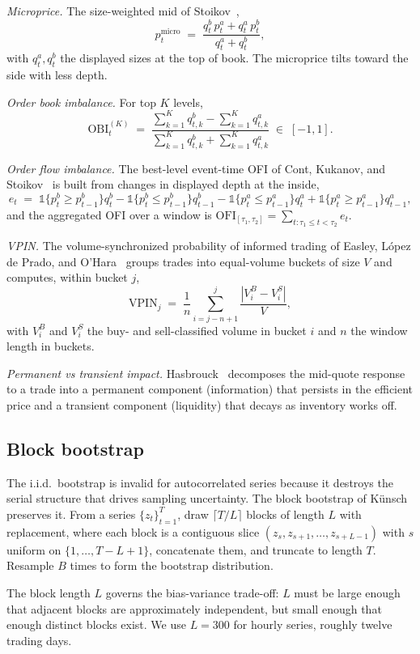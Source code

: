 \documentclass[11pt]{article}
\begin{document}
\emph{Microprice.} The size-weighted mid of Stoikov~\cite{stoikov2018microprice},
\[
p^{\mathrm{micro}}_t \;=\; \frac{q^b_t \, p^a_t + q^a_t \, p^b_t}{q^a_t + q^b_t},
\]
with $q^a_t, q^b_t$ the displayed sizes at the top of book. The microprice tilts toward the
side with less depth.

\emph{Order book imbalance.} For top $K$ levels,
\[
\mathrm{OBI}_t^{(K)} \;=\; \frac{\sum_{k=1}^{K} q^b_{t,k} - \sum_{k=1}^{K} q^a_{t,k}}
    {\sum_{k=1}^{K} q^b_{t,k} + \sum_{k=1}^{K} q^a_{t,k}} \;\in\; [-1, 1].
\]

\emph{Order flow imbalance.} The best-level event-time OFI of Cont, Kukanov, and
Stoikov~\cite{contkukanovstoikov2014} is built from changes in displayed depth at the inside,
\[
e_t \;=\; \mathbb{1}\{p^b_t \geq p^b_{t-1}\} q^b_t - \mathbb{1}\{p^b_t \leq p^b_{t-1}\} q^b_{t-1}
    - \mathbb{1}\{p^a_t \leq p^a_{t-1}\} q^a_t + \mathbb{1}\{p^a_t \geq p^a_{t-1}\} q^a_{t-1},
\]
and the aggregated OFI over a window is
$\mathrm{OFI}_{[\tau_1, \tau_2]} = \sum_{t: \tau_1 \leq t < \tau_2} e_t$.

\emph{VPIN.} The volume-synchronized probability of informed trading of Easley, L\'opez de
Prado, and O'Hara~\cite{easley2012vpin} groups trades into equal-volume buckets of size $V$
and computes, within bucket $j$,
\[
\mathrm{VPIN}_j \;=\; \frac{1}{n} \sum_{i=j-n+1}^{j} \frac{|V_i^B - V_i^S|}{V},
\]
with $V_i^B$ and $V_i^S$ the buy- and sell-classified volume in bucket $i$ and $n$ the
window length in buckets.

\emph{Permanent vs transient impact.} Hasbrouck~\cite{hasbrouck1991measuring} decomposes
the mid-quote response to a trade into a permanent component (information) that persists in
the efficient price and a transient component (liquidity) that decays as inventory works
off.

\subsection{Block bootstrap}
\label{app:bb}

The i.i.d.~bootstrap is invalid for autocorrelated series because it destroys the serial
structure that drives sampling uncertainty. The block bootstrap of
K\"unsch~\cite{kunsch1989block} preserves it. From a series $\{z_t\}_{t=1}^{T}$, draw
$\lceil T / L \rceil$ blocks of length $L$ with replacement, where each block is a
contiguous slice $(z_s, z_{s+1}, \dots, z_{s+L-1})$ with $s$ uniform on
$\{1, \dots, T - L + 1\}$, concatenate them, and truncate to length $T$. Resample $B$ times
to form the bootstrap distribution.

The block length $L$ governs the bias-variance trade-off: $L$ must be large enough that
adjacent blocks are approximately independent, but small enough that enough distinct blocks
exist. We use $L = 300$ for hourly series, roughly twelve trading days.
\end{document}
